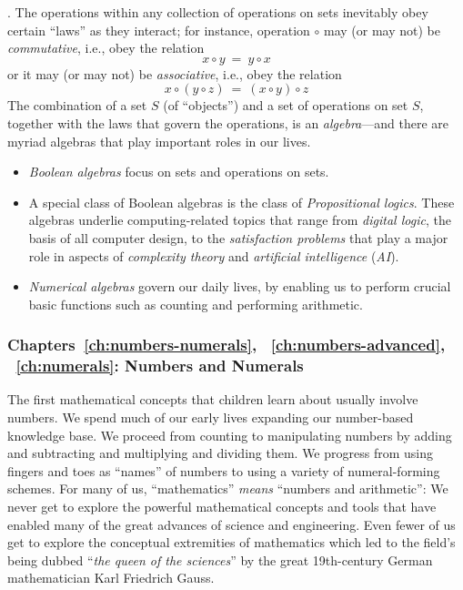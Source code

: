 \medskip

.
The operations within any collection of operations on sets inevitably obey certain ``laws'' as they interact; for instance, operation $\circ$ may (or may not) be {\em commutative}, i.e., obey the relation
\[ x \circ y \ = \ y \circ x \]
or it may (or may not) be {\em associative}, i.e., obey the relation
\[ x \circ (y \circ z) \ = \ (x \circ y) \circ z \]
The combination of a set $S$ (of ``objects'') and a set of operations on set $S$, together with the laws that govern the operations, is an {\em algebra}---and there are myriad algebras that play important roles in our lives.
\begin{itemize}
\item
{\em Boolean algebras} focus on sets and operations on sets.
\medskip\item
A special class of Boolean algebras is the class of {\em Propositional logics}.  These algebras underlie computing-related topics that range from {\em digital logic}, the basis of all computer design, to the {\em satisfaction problems} that play a major role in aspects of  {\em complexity theory} and {\em artificial intelligence} ({\em AI}).
\medskip\item
{\em Numerical algebras} govern our daily lives, by enabling us to perform crucial basic functions such as counting and performing arithmetic.
\end{itemize}


\subsubsection{Chapters~\ref{ch:numbers-numerals},
~\ref{ch:numbers-advanced}, ~\ref{ch:numerals}: Numbers and Numerals}

The first mathematical concepts that children learn about usually involve numbers.  We spend much of our early lives expanding our number-based knowledge base.  We proceed from counting to manipulating numbers by adding and subtracting and multiplying and dividing them.
We progress from using fingers and toes as ``names'' of numbers to using a variety of numeral-forming schemes.  For many of us, ``mathematics'' {\em means} ``numbers and arithmetic'': We never get to explore the powerful mathematical concepts and tools that have enabled many of the great advances of science and engineering.  Even fewer of us get to explore the conceptual extremities of mathematics which led to the field's being dubbed ``{\em the queen of the  sciences}'' by the great 19th-century German mathematician Karl Friedrich Gauss. 

